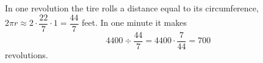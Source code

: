 In one revolution the tire rolls a distance equal to its circumference, $2\pi r\approx2\cdot\dfrac{22}{7}\cdot1=\dfrac{44}{7}$ feet. In one minute it makes
\[
4400\div\dfrac{44}{7}=4400\cdot\dfrac{7}{44}=\boxed{700}
\]
revolutions.
